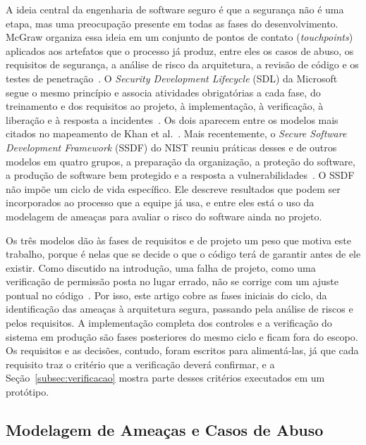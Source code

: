 \documentclass[conference]{IEEEtran}
\begin{document}
A ideia central da engenharia de software seguro é que a segurança não é uma etapa, mas uma preocupação presente em todas as fases do desenvolvimento. McGraw organiza essa ideia em um conjunto de pontos de contato (\textit{touchpoints}) aplicados aos artefatos que o processo já produz, entre eles os casos de abuso, os requisitos de segurança, a análise de risco da arquitetura, a revisão de código e os testes de penetração~\cite{mcgraw2006}. O \textit{Security Development Lifecycle} (SDL) da Microsoft segue o mesmo princípio e associa atividades obrigatórias a cada fase, do treinamento e dos requisitos ao projeto, à implementação, à verificação, à liberação e à resposta a incidentes~\cite{howard2006}. Os dois aparecem entre os modelos mais citados no mapeamento de Khan et al.~\cite{khan2020}. Mais recentemente, o \textit{Secure Software Development Framework} (SSDF) do NIST reuniu práticas desses e de outros modelos em quatro grupos, a preparação da organização, a proteção do software, a produção de software bem protegido e a resposta a vulnerabilidades~\cite{nist2022ssdf}. O SSDF não impõe um ciclo de vida específico. Ele descreve resultados que podem ser incorporados ao processo que a equipe já usa, e entre eles está o uso da modelagem de ameaças para avaliar o risco do software ainda no projeto.

Os três modelos dão às fases de requisitos e de projeto um peso que motiva este trabalho, porque é nelas que se decide o que o código terá de garantir antes de ele existir. Como discutido na introdução, uma falha de projeto, como uma verificação de permissão posta no lugar errado, não se corrige com um ajuste pontual no código~\cite{arce2014}. Por isso, este artigo cobre as fases iniciais do ciclo, da identificação das ameaças à arquitetura segura, passando pela análise de riscos e pelos requisitos. A implementação completa dos controles e a verificação do sistema em produção são fases posteriores do mesmo ciclo e ficam fora do escopo. Os requisitos e as decisões, contudo, foram escritos para alimentá-las, já que cada requisito traz o critério que a verificação deverá confirmar, e a Seção~\ref{subsec:verificacao} mostra parte desses critérios executados em um protótipo.

\subsection{Modelagem de Ameaças e Casos de Abuso}
\end{document}

